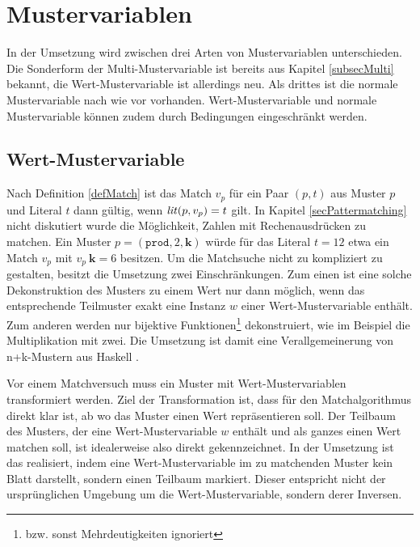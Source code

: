 \section{Mustervariablen} \label{subsecMustervariablen}
In der Umsetzung wird zwischen drei Arten von Mustervariablen unterschieden. Die Sonderform der Multi-Mustervariable ist bereits aus Kapitel \ref{subsecMulti} bekannt, die Wert-Mustervariable ist allerdings neu. Als drittes ist die normale Mustervariable nach wie vor vorhanden. Wert-Mustervariable und normale Mustervariable können zudem durch Bedingungen eingeschränkt werden.

\subsection{Wert-Mustervariable} \label{subsubsecWertMustervariable}
Nach Definition \ref{defMatch} ist das Match $v_p$ für ein Paar $(p, t)$ aus Muster $p$ und Literal $t$ dann gültig, wenn $\mathit{lit}(p, v_p) = t$ gilt. In Kapitel \ref{secPattermatching} nicht diskutiert wurde die Möglichkeit, Zahlen mit Rechenausdrücken zu matchen. Ein Muster $p = (\texttt{prod}, 2, \mathbf k)$ würde für das Literal $t = 12$ etwa ein Match $v_p$ mit $v_p~\mathbf k = 6$ besitzen. Um die Matchsuche nicht zu kompliziert zu gestalten, besitzt die Umsetzung zwei Einschränkungen. Zum einen ist eine solche Dekonstruktion des Musters zu einem Wert nur dann möglich, wenn das entsprechende Teilmuster exakt eine Instanz $w$ einer Wert-Mustervariable enthält. Zum anderen werden nur bijektive Funktionen\footnote{bzw. sonst Mehrdeutigkeiten ignoriert} dekonstruiert, wie im Beispiel die Multiplikation mit zwei. Die Umsetzung ist damit eine Verallgemeinerung von n+k-Mustern aus Haskell \cite{nPlusK}.


Vor einem Matchversuch muss ein Muster mit Wert-Mustervariablen transformiert werden. Ziel der Transformation ist, dass für den Matchalgorithmus direkt klar ist, ab wo das Muster einen Wert repräsentieren soll. Der Teilbaum des Musters, der eine Wert-Mustervariable $w$ enthält und als ganzes einen Wert matchen soll, ist idealerweise also direkt gekennzeichnet. In der Umsetzung ist das realisiert, indem eine Wert-Mustervariable im zu matchenden Muster kein Blatt darstellt, sondern einen Teilbaum markiert. Dieser entspricht nicht der ursprünglichen Umgebung um die Wert-Mustervariable, sondern derer Inversen. 

